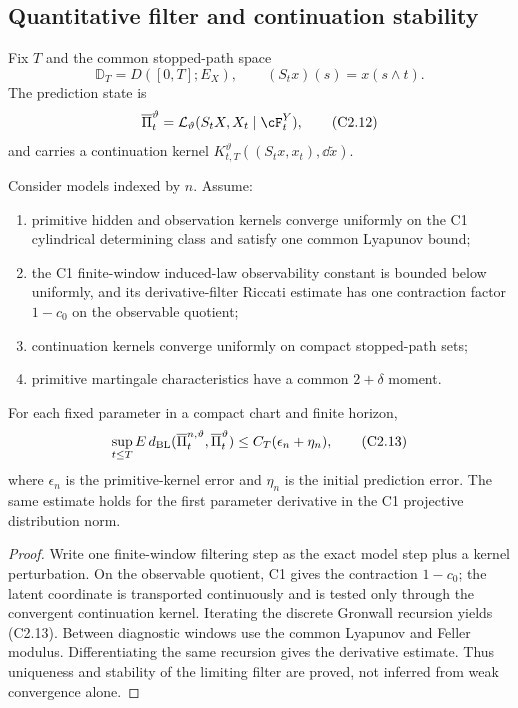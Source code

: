 \subsection{Quantitative filter and continuation stability}

Fix $T$ and the common stopped-path space
\[
 \mathbb D_T=D([0,T];E_X),\qquad
 (S_tx)(s)=x(s\wedge t).                                  \tag{C2.11}
\]
The prediction state is
\[
 \overline\Pi_t^\vartheta
 =\mathcal L_\vartheta(S_tX,X_t\mid\cF_t^Y),              \tag{C2.12}
\]
and carries a continuation kernel
$K_{t,T}^\vartheta((S_tx,x_t),\dd\widetilde x)$.

Consider models indexed by $n$.  Assume:

\begin{enumerate}[label=(P\arabic*)]
\item primitive hidden and observation kernels converge uniformly on the C1
      cylindrical determining class and satisfy one common Lyapunov bound;
\item the C1 finite-window induced-law observability constant is bounded below
      uniformly, and its derivative-filter Riccati estimate has one contraction
      factor $1-c_0$ on the observable quotient;
\item continuation kernels converge uniformly on compact stopped-path sets;
\item primitive martingale characteristics have a common $2+\delta$ moment.
\end{enumerate}

\begin{lemma}
\label{lem:r31-c2-filter-stability}
For each fixed parameter in a compact chart and finite horizon,
\[
 \sup_{t\le T}E\,d_{\rm BL}(
   \overline\Pi_t^{n,\vartheta},\overline\Pi_t^\vartheta)
 \le C_T(\epsilon_n+\eta_n),                              \tag{C2.13}
\]
where $\epsilon_n$ is the primitive-kernel error and $\eta_n$ is the initial
prediction error.  The same estimate holds for the first parameter derivative
in the C1 projective distribution norm.
\end{lemma}

\begin{proof}
Write one finite-window filtering step as the exact model step plus a kernel
perturbation.  On the observable quotient, C1 gives the contraction
$1-c_0$; the latent coordinate is transported continuously and is tested only
through the convergent continuation kernel.  Iterating the discrete Gronwall
recursion yields (C2.13).  Between diagnostic windows use the common Lyapunov
and Feller modulus.  Differentiating the same recursion gives the derivative
estimate.  Thus uniqueness and stability of the limiting filter are proved,
not inferred from weak convergence alone.
\end{proof}

